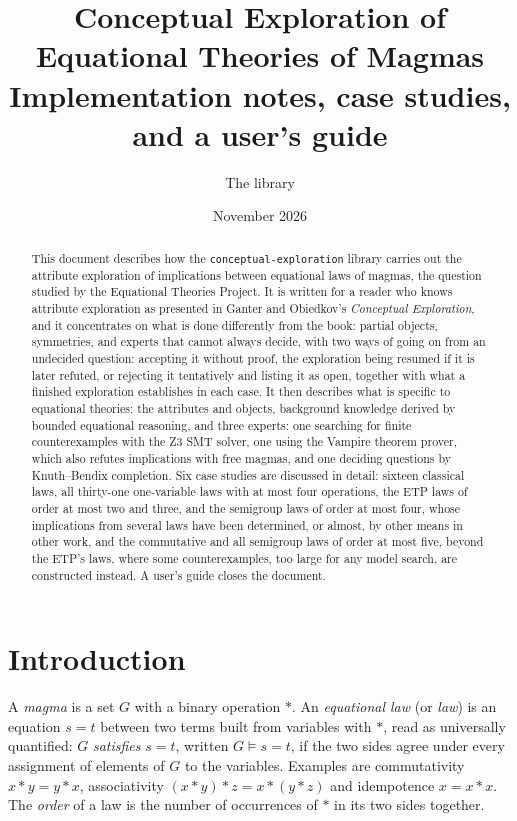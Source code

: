 \documentclass[11pt,a4paper]{article}
\title{Conceptual Exploration of Equational Theories of Magmas\\[4pt]
\large Implementation notes, case studies, and a user's guide}
\author{The \code{conceptual-exploration} library}
\date{November 2026}
\theoremstyle{definition}
\theoremstyle{remark}
\newcommand{\code}[1]{\texttt{#1}}
\begin{document}
\maketitle

\begin{abstract}
This document describes how the \code{conceptual-exploration} library carries out the attribute exploration of implications between equational laws of magmas, the question studied by the Equational Theories Project. It is written for a reader who knows attribute exploration as presented in Ganter and Obiedkov's \emph{Conceptual Exploration}, and it concentrates on what is done differently from the book: partial objects, symmetries, and experts that cannot always decide, with two ways of going on from an undecided question: accepting it without proof, the exploration being resumed if it is later refuted, or rejecting it tentatively and listing it as open, together with what a finished exploration establishes in each case. It then describes what is specific to equational theories: the attributes and objects, background knowledge derived by bounded equational reasoning, and three experts: one searching for finite counterexamples with the Z3 SMT solver, one using the Vampire theorem prover, which also refutes implications with free magmas, and one deciding questions by Knuth--Bendix completion. Six case studies are discussed in detail: sixteen classical laws, all thirty-one one-variable laws with at most four operations, the ETP laws of order at most two and three, and the semigroup laws of order at most four, whose implications from several laws have been determined, or almost, by other means in other work, and the commutative and all semigroup laws of order at most five, beyond the ETP's laws, where some counterexamples, too large for any model search, are constructed instead. A user's guide closes the document.
\end{abstract}

\tableofcontents

\section{Introduction}

A \emph{magma} is a set $G$ with a binary operation $*$. An \emph{equational law} (or \emph{law}) is an equation $s = t$ between two terms built from variables with $*$, read as universally quantified: $G$ \emph{satisfies} $s = t$, written $G \models s = t$, if the two sides agree under every assignment of elements of $G$ to the variables. Examples are commutativity $x * y = y * x$, associativity $(x * y) * z = x * (y * z)$ and idempotence $x = x * x$. The \emph{order} of a law is the number of occurrences of $*$ in its two sides together.
\end{document}

